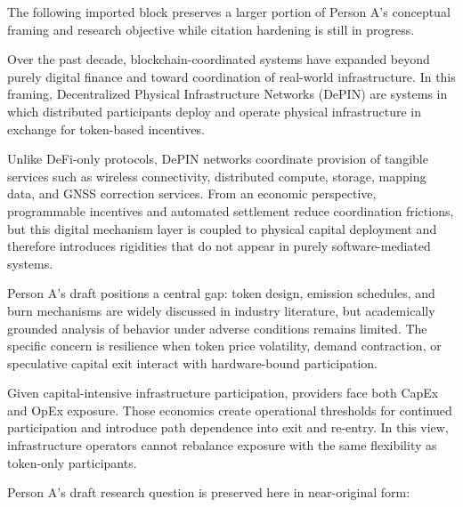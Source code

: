 
The following imported block preserves a larger portion of Person A's conceptual framing and research objective while citation hardening is still in progress.

Over the past decade, blockchain-coordinated systems have expanded beyond purely digital finance and toward coordination of real-world infrastructure. In this framing, Decentralized Physical Infrastructure Networks (DePIN) are systems in which distributed participants deploy and operate physical infrastructure in exchange for token-based incentives.

Unlike DeFi-only protocols, DePIN networks coordinate provision of tangible services such as wireless connectivity, distributed compute, storage, mapping data, and GNSS correction services. From an economic perspective, programmable incentives and automated settlement reduce coordination frictions, but this digital mechanism layer is coupled to physical capital deployment and therefore introduces rigidities that do not appear in purely software-mediated systems.

Person A's draft positions a central gap: token design, emission schedules, and burn mechanisms are widely discussed in industry literature, but academically grounded analysis of behavior under adverse conditions remains limited. The specific concern is resilience when token price volatility, demand contraction, or speculative capital exit interact with hardware-bound participation.

Given capital-intensive infrastructure participation, providers face both CapEx and OpEx exposure. Those economics create operational thresholds for continued participation and introduce path dependence into exit and re-entry. In this view, infrastructure operators cannot rebalance exposure with the same flexibility as token-only participants.

Person A's draft research question is preserved here in near-original form:


